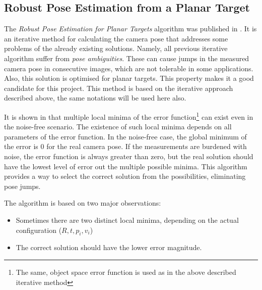 \subsection{Robust Pose Estimation from a Planar Target}

The \textit{Robust Pose Estimation for Planar Targets} algorithm was published in \cite{robust}.
It is an iterative method for calculating the camera pose that addresses some problems of the already existing solutions.
Namely, all previous iterative algorithm suffer from \textit{pose ambiguities}\cite{robust}.
These can cause jumps in the measured camera pose in consecutive images, which are not tolerable in some applications.
Also, this solution is optimised for planar targets.
This property makes it a good candidate for this project.
This method is based on the iterative approach described above, the same notations will be used here also.

It is shown in \cite{robust} that multiple local minima of the error function\footnote{The same, object space error function is used as in the above described iterative method} can exist even in the noise-free scenario.
The existence of such local minima depends on all parameters of the error function.
In the noise-free case, the global minimum of the error is 0 for the real camera pose.
If the measurements are burdened with noise, the error function is always greater than zero, but the real solution should have the lowest level of error out the multiple possible minima.
This algorithm provides a way to select the correct solution from the possibilities, eliminating pose jumps.

The algorithm is based on two major observations\cite{robust}:
\begin{itemize}
	\item Sometimes there are two distinct local minima, depending on the actual configuration ($R, t, p_i, v_i$)
	\item The correct solution should have the lower error magnitude.
\end{itemize}

